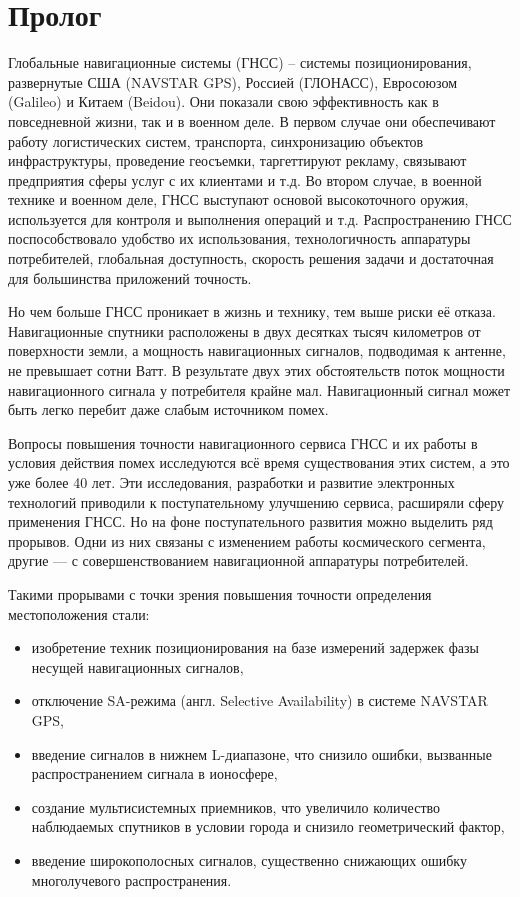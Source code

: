 \chapter*{Пролог}
\thispagestyle{chapterpage}
\let\oldleftmark=\leftmark
\renewcommand{\leftmark}{Пролог}

Глобальные навигационные системы (ГНСС) -- системы позиционирования, развернутые США (NAVSTAR GPS), Россией (ГЛОНАСС), Евросоюзом (Galileo) и Китаем (Beidou). 
Они показали свою эффективность как в повседневной жизни, так и в военном деле. 
В первом случае они обеспечивают работу логистических систем, транспорта, синхронизацию объектов инфраструктуры, проведение геосъемки, таргеттируют рекламу, связывают предприятия сферы услуг с их клиентами и т.д.
Во втором случае, в военной технике и военном деле, ГНСС выступают основой высокоточного оружия, используется для контроля и выполнения операций и т.д. 
Распространению ГНСС поспособствовало удобство их использования, технологичность аппаратуры потребителей, глобальная доступность, скорость решения задачи и достаточная для большинства приложений точность. 

Но чем больше ГНСС проникает в жизнь и технику, тем выше риски её отказа. 
Навигационные спутники расположены в двух десятках тысяч километров от поверхности земли, а мощность навигационных сигналов, подводимая к антенне, не превышает сотни Ватт. 
В результате двух этих обстоятельств поток мощности навигационного сигнала у потребителя крайне мал. 
Навигационный сигнал может быть легко перебит даже слабым источником помех. 

Вопросы повышения точности навигационного сервиса ГНСС и их работы в условия действия помех исследуются всё время существования этих систем, а это уже более 40 лет. 
Эти исследования, разработки и развитие электронных технологий приводили к поступательному улучшению сервиса, расширяли сферу применения ГНСС. 
Но на фоне поступательного развития можно выделить ряд прорывов. 
Одни из них связаны с изменением работы космического сегмента, другие --- с совершенствованием навигационной аппаратуры потребителей. 

Такими прорывами с точки зрения повышения точности определения местоположения стали:
\begin{itemize}
\item изобретение техник позиционирования на базе измерений задержек фазы несущей навигационных сигналов,
\item отключение SA-режима (англ. Selective Availability) в системе NAVSTAR GPS,
\item введение сигналов в нижнем L-диапазоне, что снизило ошибки, вызванные распространением сигнала в ионосфере,
\item создание мультисистемных приемников, что увеличило количество наблюдаемых спутников в условии города и снизило геометрический фактор, 
\item введение широкополосных сигналов, существенно снижающих ошибку многолучевого распространения.
\end{itemize}

